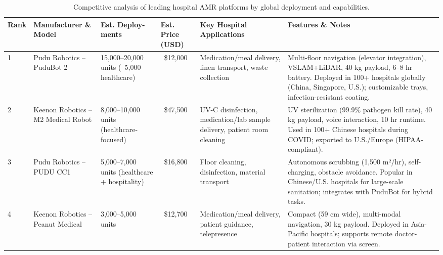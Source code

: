 \begin{table}[H]
\centering
\small
\begin{tabular}{|l|p{2.5cm}|p{2cm}|p{1.5cm}|p{2.5cm}|p{4cm}|}
\hline
    \textbf{Rank} & \textbf{Manufacturer \& Model} & \textbf{Est. Deploy-ments} & \textbf{Est. Price (USD)} & \textbf{Key Hospital Applications} & \textbf{Features \& Notes} \\
\hline
1 & Pudu Robotics – PuduBot 2 \cite{pudubot2} & 15,000–20,000 units (~5,000 healthcare) & ~\$12,000 & Medication/meal delivery, linen transport, waste collection & Multi-floor navigation (elevator integration), VSLAM+LiDAR, 40 kg payload, 6–8 hr battery. Deployed in 100+ hospitals globally (China, Singapore, U.S.); customizable trays, infection-resistant coating. \\
\hline
2 & Keenon Robotics – M2 Medical Robot \cite{m2medical} & 8,000–10,000 units (healthcare-focused) & ~\$47,500 & UV-C disinfection, medication/lab sample delivery, patient room cleaning & UV sterilization (99.9\% pathogen kill rate), 40 kg payload, voice interaction, 10 hr runtime. Used in 100+ Chinese hospitals during COVID; exported to U.S./Europe (HIPAA-compliant). \\
\hline
3 & Pudu Robotics – PUDU CC1 \cite{puducc1} & 5,000–7,000 units (healthcare + hospitality) & ~\$16,800 & Floor cleaning, disinfection, material transport & Autonomous scrubbing (1,500 m²/hr), self-charging, obstacle avoidance. Popular in Chinese/U.S. hospitals for large-scale sanitation; integrates with PuduBot for hybrid tasks. \\
\hline
4 & Keenon Robotics – Peanut Medical \cite{peanutmedical} & 3,000–5,000 units & ~\$12,700 & Medication/meal delivery, patient guidance, telepresence & Compact (59 cm wide), multi-modal navigation, 30 kg payload. Deployed in Asia-Pacific hospitals; supports remote doctor-patient interaction via screen. \\
\hline
\end{tabular}
\caption{Competitive analysis of leading hospital AMR platforms by global deployment and capabilities.}
\label{tab:competitive}
\end{table}

